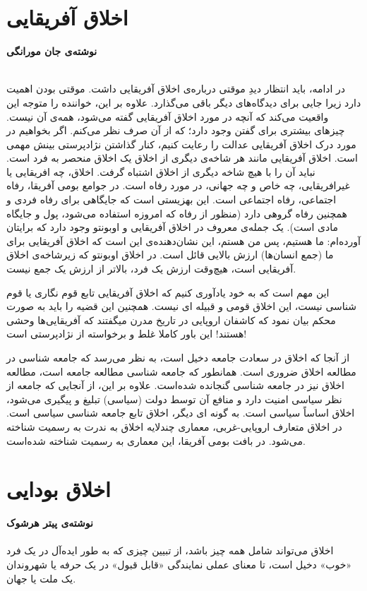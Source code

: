 \newpage

{
\section*{اخلاق آفریقایی}
\label{sec:اخلاق آفریقایی}
\textbf{نوشته‌ی جان مورانگی}
\\\\
}
در ادامه، باید انتظار دیدِ موقتی درباره‌ی اخلاق آفریقایی داشت.
موقتی بودن اهمیت دارد زیرا جایی برای دیدگاه‌های دیگر باقی می‌گذارد.
علاوه بر این، خواننده را متوجه این واقعیت می‌کند که آنچه در مورد اخلاق آفریقایی گفته می‌شود، همه‌ی آن نیست.
چیزهای بیشتری برای گفتن وجود دارد؛ که از آن صرف نظر می‌کنم.
اگر بخواهیم در مورد درک اخلاق آفریقایی عدالت را رعایت کنیم، کنار گذاشتن نژادپرستی بینش مهمی است.
اخلاق آفریقایی مانند هر شاخه‌ی دیگری از اخلاق یک اخلاق منحصر به فرد است.
نباید آن را با هیچ شاخه دیگری از اخلاق اشتباه گرفت.
اخلاق، چه افریقایی یا غیرافریقایی، چه خاص و چه جهانی، در مورد رفاه است.
در جوامع بومی آفریقا، رفاه اجتماعی، رفاه اجتماعی است.
این بهزیستی است که جایگاهی برای رفاه فردی و همچنین رفاه گروهی دارد (منظور از رفاه که امروزه استفاده می‌شود، پول و جایگاه مادی است).
یک جمله‌ی معروف در اخلاق آفریقایی و اوبونتو وجود دارد که برایتان آورده‌ام: ما هستیم، پس من هستم، این نشان‌دهنده‌ی این است که اخلاق آفریقایی برای ما (جمع انسان‌ها) ارزش بالایی قائل است.
در اخلاق اوبونتو که زیرشاخه‌ی اخلاق آفریقایی است، هیچ‌وقت ارزش یک فرد، بالاتر از ارزش یک جمع نیست.

این مهم است که به خود یادآوری کنیم که اخلاق آفریقایی تابع قوم نگاری یا قوم شناسی نیست، این اخلاق قومی و قبیله ای نیست.
همچنین این قضیه را باید به صورت محکم بیان نمود که کاشفان اروپایی در تاریخ مدرن میگفتند که آفریقایی‌ها وحشی هستند!
این باور کاملا غلط و برخواسته از نژادپرستی است!

از آنجا که اخلاق در سعادت جامعه دخیل است، به نظر می‌رسد که جامعه شناسی در مطالعه اخلاق ضروری است.
همانطور که جامعه شناسی مطالعه جامعه است، مطالعه اخلاق نیز در جامعه شناسی گنجانده شده‌است.
علاوه بر این، از آنجایی که جامعه از نظر سیاسی امنیت دارد و منافع آن توسط دولت (سیاسی) تبلیغ و پیگیری می‌شود، اخلاق اساساً سیاسی است.
به گونه ای دیگر، اخلاق تابع جامعه شناسی سیاسی است.
در اخلاق متعارف اروپایی-غربی، معماری چندلایه اخلاق به ندرت به رسمیت شناخته می‌شود.
در بافت بومی آفریقا، این معماری به رسمیت شناخته شده‌است.
\newline
\newline

{
\section*{اخلاق بودایی}
\label{sec:اخلاق بودایی}
\textbf{نوشته‌ی پیتر هرشوک}
\\\\
اخلاق می‌تواند شامل همه چیز باشد، از تبیین چیزی که به طور ایده‌آل در یک فرد «خوب» دخیل است، تا معنای عملی نمایندگی «قابل قبول» در یک حرفه یا شهروندان یک ملت یا جهان.
}

